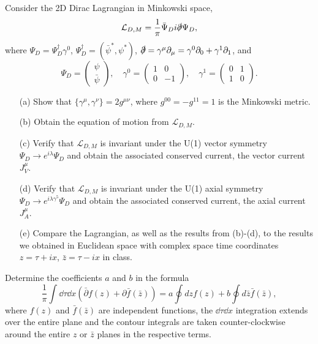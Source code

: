 	\begin{Problem} 
	Consider the 2D Dirac Lagrangian in Minkowski space,
	\[
	\mathcal{L}_{D, M} = \frac{1}{\pi} \bar{\Psi}_D i \slashed{\partial} \Psi_D,
	\]
	where $\Psi_D = \Psi_D^\dagger \gamma^0$, $\Psi_D^\dagger = (\bar{\psi}^*, \psi^*)$, $\slashed{\partial} = \gamma^\mu \partial_\mu = \gamma^0 \partial_0 + \gamma^1 \partial_1$, and
	\[
	\Psi_D = \begin{pmatrix} \psi \\ \bar{\psi} \end{pmatrix}, \quad
	\gamma^0 = \begin{pmatrix} 1 & 0 \\ 0 & -1 \end{pmatrix}, \quad
	\gamma^1 = \begin{pmatrix} 0 & 1 \\ 1 & 0 \end{pmatrix}.
	\]
	
	\begin{enumerate}
		\item[(a)] Show that $\{\gamma^\mu, \gamma^\nu\} = 2 g^{\mu\nu}$, where $g^{00} = -g^{11} = 1$ is the Minkowski metric.
		\item[(b)] Obtain the equation of motion from $\mathcal{L}_{D,M}$.
		\item[(c)] Verify that $\mathcal{L}_{D,M}$ is invariant under the U(1) vector symmetry $\Psi_D \to e^{i\lambda} \Psi_D$ and obtain the associated conserved current, the vector current $J^\mu_V$.
		\item[(d)] Verify that $\mathcal{L}_{D,M}$ is invariant under the U(1) axial symmetry $\Psi_D \to e^{i\lambda\gamma^5} \Psi_D$ and obtain the associated conserved current, the axial current $J^\mu_A$.
		\item[(e)] Compare the Lagrangian, as well as the results from (b)-(d), to the results we obtained in Euclidean space with complex space time coordinates $z = \tau + ix$, $\bar{z} = \tau - ix$ in class.
	\end{enumerate}
			
\end{Problem}
	
	\begin{Problem}
			Determine the coefficients $a$ and $b$ in the formula
	\[
	\frac{1}{\pi} \int \dd{\tau} \dd{x} \left( \bar{\partial} f(z) + \partial \bar{f}(\bar{z}) \right) = a \oint dz f(z) + b \oint d\bar{z} \bar{f}(\bar{z}),
	\]
	where $f(z)$ and $\bar{f}(\bar{z})$ are independent functions, the $\dd{\tau} \dd{x}$ integration extends over the entire plane and the contour integrals are taken counter-clockwise around the entire $z$ or $\bar{z}$ planes in the respective terms.
\end{Problem}
